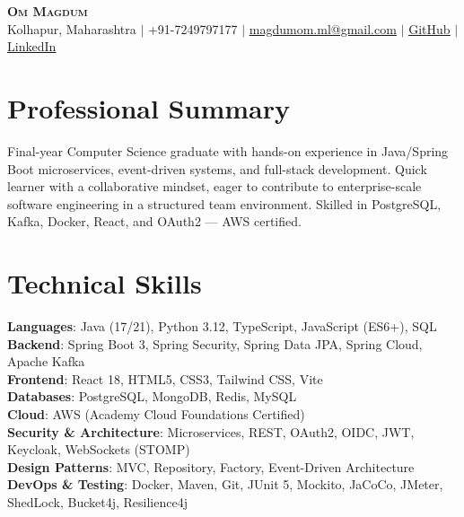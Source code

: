\documentclass[letterpaper,11pt]{article}
\begin{document}
\begin{center}
    \textbf{\Huge \scshape Om Magdum} \\ \vspace{1pt}
    \small Kolhapur, Maharashtra $|$ +91-7249797177 $|$ \href{mailto:magdumom.ml@gmail.com}{\underline{magdumom.ml@gmail.com}} $|$ 
    \href{https://github.com/ommagdum}{\underline{GitHub}} $|$
    \href{https://www.linkedin.com/in/om-ml-engg/}{\underline{LinkedIn}}
\end{center}
\section{Professional Summary}
\small{Final-year Computer Science graduate with hands-on experience in Java/Spring Boot microservices, event-driven systems, and full-stack development. Quick learner with a collaborative mindset, eager to contribute to enterprise-scale software engineering in a structured team environment. Skilled in PostgreSQL, Kafka, Docker, React, and OAuth2 --- AWS certified.}
\section{Technical Skills}
 \begin{itemize}[leftmargin=0.15in, label={}]
    \small{\item{
     \textbf{Languages}{: Java (17/21), Python 3.12, TypeScript, JavaScript (ES6+), SQL} \\
     \textbf{Backend}{: Spring Boot 3, Spring Security, Spring Data JPA, Spring Cloud, Apache Kafka} \\
     \textbf{Frontend}{: React 18, HTML5, CSS3, Tailwind CSS, Vite} \\
     \textbf{Databases}{: PostgreSQL, MongoDB, Redis, MySQL} \\
     \textbf{Cloud}{: AWS (Academy Cloud Foundations Certified)} \\
     \textbf{Security \& Architecture}{: Microservices, REST, OAuth2, OIDC, JWT, Keycloak, WebSockets (STOMP)} \\
     \textbf{Design Patterns}{: MVC, Repository, Factory, Event-Driven Architecture} \\
     \textbf{DevOps \& Testing}{: Docker, Maven, Git, JUnit 5, Mockito, JaCoCo, JMeter, ShedLock, Bucket4j, Resilience4j} \\
    }}
 \end{itemize}
\end{document}
